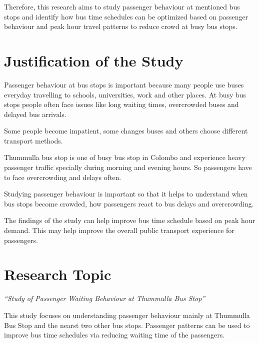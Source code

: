 \documentclass[12pt,a4paper]{report}
\begin{document}
Therefore, this research aims to study passenger behaviour at mentioned bus stops and identify how bus time schedules can be optimized based on passenger behaviour and peak hour travel patterns to reduce crowd at busy bus stops. 


\section{Justification of the Study}

Passenger behaviour at bus stops is important because many  people use buses everyday travelling to schools, universities, work and other places. At busy bus stops people often face issues like long waiting times, overcrowded buses and delayed bus arrivals.

Some people become impatient, some changes buses and others choose different transport methods. 

Thummulla bus stop is one of busy bus stop in Colombo and experience heavy passenger traffic specially during morning and evening hours. So passengers have to face overcrowding and delays often.

Studying passenger behaviour is important  so that it helps to understand when bus stops become crowded, how passengers react to bus delays and overcrowding.

The findings of the study can help improve bus time schedule based on peak hour demand. This may help improve the overall public transport experience for passengers.  


\section{Research Topic}

\begin{center}
\textit{
“Study of Passenger Waiting Behaviour at Thummulla Bus Stop”
}
\end{center}

This study focuses on understanding passenger behaviour  mainly at Thummulla Bus Stop and the nearst two other bus stops. Passenger patterns can be used to improve bus time schedules via reducing waiting time of the passengers.

%


\end{document}

